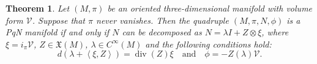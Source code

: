 \documentclass[12pt]{article}
\newtheorem{theorem}{Theorem}%
\newtheorem{prop}[theorem]{Proposition}
\begin{document}
\begin{theorem}\label{prop 3D PqN} %
Let $(M,\pi)$ be an oriented three-dimensional manifold with volume form $\mathcal V$. 
Suppose that $\pi$ never vanishes.
Then the quadruple $(M,\pi,N,\phi)$ is a PqN manifold if and only if $N$ can be decomposed as $N=\lambda I+Z\otimes\xi$, where $\xi=i_{\pi}\mathcal V$,  $Z\in\mathfrak X(M)$, $\lambda\in C^{\infty}(M)$ and the following conditions hold:
\begin{equation}\label{eq: 3D PqN conditions}
d\left(\lambda+\left<\xi,Z\right>\right)=\operatorname{div}(Z)\xi\quad\text{and}\quad\phi=-Z(\lambda)\mathcal V.
\end{equation}
\end{theorem}
\end{document}
